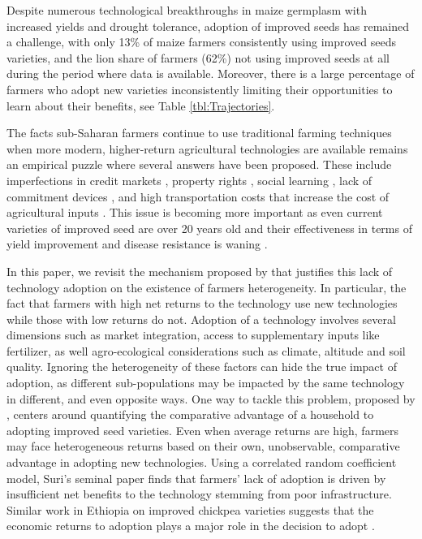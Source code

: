 \documentclass{article}
\begin{document}
Despite numerous technological breakthroughs in maize germplasm with increased yields and drought tolerance, adoption of improved seeds has remained a challenge, with only 13\% of maize farmers consistently using improved seeds varieties, and the lion share of farmers (62\%) not using improved seeds at all during the period where data is available. Moreover, there is a large percentage of farmers who adopt new varieties inconsistently limiting their opportunities to learn about their benefits, see Table \ref{tbl:Trajectories}. 

The facts sub-Saharan farmers continue to use traditional farming techniques when more modern, higher-return agricultural technologies are available remains an empirical puzzle where several answers have been proposed. These include imperfections in credit markets \citep{Croppenstedt2003-pq}, property rights \citep{Place2000-el}, social learning \citep{Conley2010-ue,Foster1995-bz,Munshi2004-og}, lack of commitment devices \cite{Duflo2009-iv}, and high transportation costs that increase the cost of agricultural inputs \citep{Byerlee2013-qk}. This issue is becoming more important as even current varieties of improved seed are over 20 years old and their effectiveness in terms of yield improvement and disease resistance is waning \citep{Abate2015-rj}. 


In this paper, we revisit the mechanism proposed by  \citep{Suri2011-oi} that justifies this lack of technology adoption on the existence of farmers heterogeneity. In particular, the fact that farmers with high net returns to the technology use new technologies while those with low returns do not. Adoption of a technology involves several dimensions such as market integration, access to supplementary inputs like fertilizer, as well agro-ecological considerations such as climate, altitude and soil quality. Ignoring the heterogeneity of these factors can hide the true impact of adoption, as different sub-populations may be impacted by the same technology in different, and even opposite ways. One way to tackle this problem, proposed by \citep{Suri2011-oi}, centers around quantifying the comparative advantage of a household to adopting improved seed varieties. Even when average returns are high, farmers may face heterogeneous returns based on their own, unobservable, comparative advantage in adopting new technologies. Using a correlated random coefficient model, Suri’s seminal paper finds that farmers’ lack of adoption is driven by insufficient net benefits to the technology stemming from poor infrastructure. Similar work in Ethiopia on improved chickpea varieties suggests that the economic returns to adoption plays a major role in the decision to adopt \citep{Michler2018-wk}.
\end{document}
